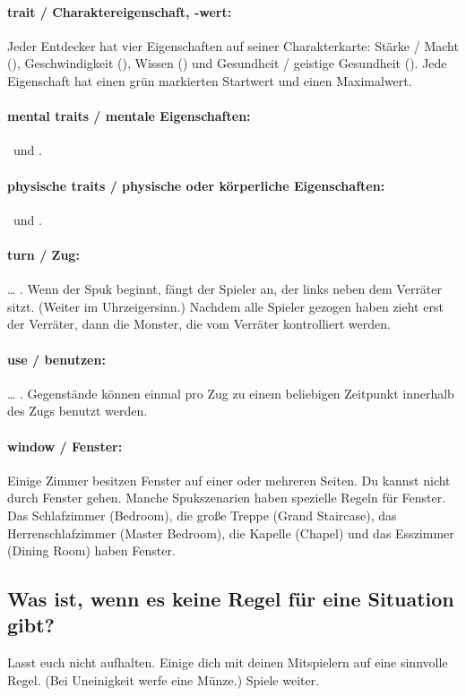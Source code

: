 \paragraph{trait / Charaktereigenschaft, -wert:} Jeder Entdecker hat vier Eigenschaften auf seiner Charakterkarte: Stärke / Macht (\might), Geschwindigkeit (\speed), Wissen (\know) und Gesundheit / geistige Gesundheit (\sanity). Jede Eigenschaft hat einen grün markierten Startwert und einen Maximalwert.

\paragraph{mental traits / mentale Eigenschaften:} \sanity\ und \know.
\paragraph{physische traits / physische oder körperliche Eigenschaften:} \speed\ und \might.

\paragraph{turn / Zug:} … . Wenn der Spuk beginnt, fängt der Spieler an, der links neben dem Verräter sitzt. (Weiter im Uhrzeigersinn.) Nachdem alle Spieler gezogen haben zieht erst der Verräter, dann die Monster, die vom Verräter kontrolliert werden.

\paragraph{use / benutzen:} … . Gegenstände können einmal pro Zug zu einem beliebigen Zeitpunkt innerhalb des Zugs benutzt werden.

\paragraph{window / Fenster:} Einige Zimmer besitzen Fenster auf einer oder mehreren Seiten. Du kannst nicht durch Fenster gehen. Manche Spukszenarien haben spezielle Regeln für Fenster. Das Schlafzimmer (Bedroom), die große Treppe (Grand Staircase), das Herrenschlafzimmer (Master Bedroom), die Kapelle (Chapel) und das Esszimmer (Dining Room) haben Fenster.

\subsection{Was ist, wenn es keine Regel für eine Situation gibt?}

Lasst euch nicht aufhalten. Einige dich mit deinen Mitspielern auf eine sinnvolle Regel. (Bei Uneinigkeit werfe eine Münze.) Spiele weiter.
